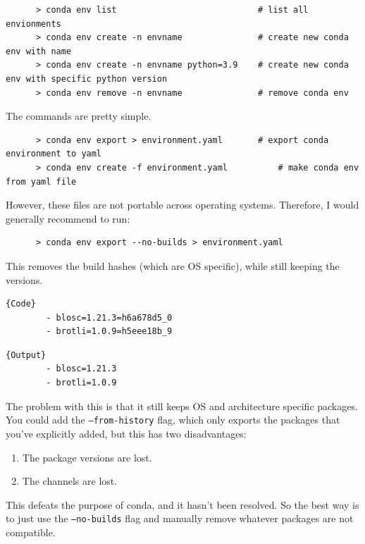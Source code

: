   \begin{example}
    \label{ex:manage-conda-envs}
    \begin{lstlisting}
      > conda env list                            # list all envionments
      > conda env create -n envname               # create new conda env with name 
      > conda env create -n envname python=3.9    # create new conda env with specific python version
      > conda env remove -n envname               # remove conda env
    \end{lstlisting}
  \end{example} 

  \begin{example}
    \label{ex:exporting-and-creating-environments}
    The commands are pretty simple. 
    \begin{lstlisting}
      > conda env export > environment.yaml       # export conda environment to yaml 
      > conda env create -f environment.yaml          # make conda env from yaml file 
    \end{lstlisting}

    However, these files are not portable across operating systems. Therefore, I would generally recommend to run: 
    \begin{lstlisting}
      > conda env export --no-builds > environment.yaml 
    \end{lstlisting}
    This removes the build hashes (which are OS specific), while still keeping the versions. 

    \noindent\begin{minipage}{.5\textwidth}
      \begin{lstlisting}[]{Code}
        - blosc=1.21.3=h6a678d5_0
        - brotli=1.0.9=h5eee18b_9
      \end{lstlisting}
      \end{minipage}
      \hfill
      \begin{minipage}{.49\textwidth}
      \begin{lstlisting}[]{Output}
        - blosc=1.21.3
        - brotli=1.0.9
      \end{lstlisting}
    \end{minipage}

    The problem with this is that it still keeps OS and architecture specific packages. You could add the \texttt{--from-history} flag, which only exports the packages that you've explicitly added, but this has two disadvantages: 
    \begin{enumerate}
      \item The package versions are lost. 
      \item The channels are lost. 
    \end{enumerate}
    This defeats the purpose of conda, and it hasn't been resolved. So the best way is to just use the \texttt{--no-builds} flag and manually remove whatever packages are not compatible. 
  \end{example}

